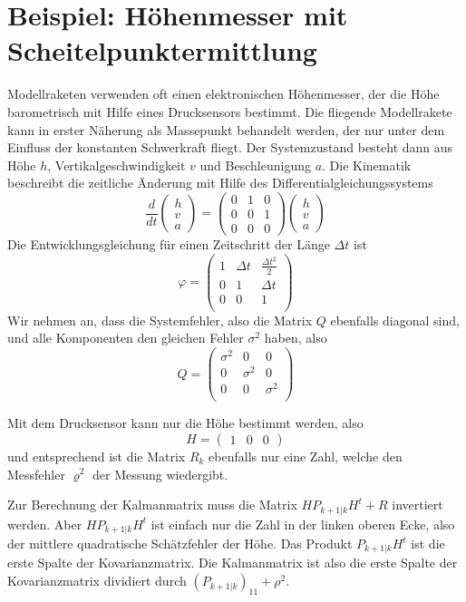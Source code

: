 %
%
%

\section{Beispiel: Höhenmesser mit Scheitelpunktermittlung}
Modellraketen verwenden oft einen elektronischen Höhenmesser, der die Höhe
barometrisch mit Hilfe eines Drucksensors bestimmt.
Die fliegende Modellrakete
kann in erster Näherung als Massepunkt behandelt werden, der nur unter dem
Einfluss der konstanten Schwerkraft fliegt.
Der Systemzustand besteht
dann aus Höhe $h$, Vertikalgeschwindigkeit $v$ und Beschleunigung $a$.
Die Kinematik beschreibt die zeitliche Änderung mit Hilfe des
Differentialgleichungssystems
\[
\frac{d}{dt}
\begin{pmatrix}
h\\v\\a
\end{pmatrix}
=
\begin{pmatrix}
0&1&0\\
0&0&1\\
0&0&0
\end{pmatrix}
\begin{pmatrix}
h\\v\\a
\end{pmatrix}
\]
Die Entwicklungsgleichung für einen Zeitschritt der Länge $\Delta t$ ist
\[
\varphi=\begin{pmatrix}
1&\Delta t&\frac{\Delta t^2}2\\
0&1&\Delta t\\
0&0&1\\
\end{pmatrix}
\]
Wir nehmen an, dass die Systemfehler, also die Matrix $Q$ ebenfalls diagonal sind,
und alle Komponenten den gleichen Fehler $\sigma^2$ haben, also
\[
Q=\begin{pmatrix}
\sigma^2&0&0\\
0&\sigma^2&0\\
0&0&\sigma^2\\
\end{pmatrix}
\]

Mit dem Drucksensor kann nur die Höhe bestimmt werden, also
\[
H=\begin{pmatrix}1&0&0\end{pmatrix}
\]
und entsprechend ist die Matrix $R_k$ ebenfalls nur eine Zahl, welche
den Messfehler $\varrho^2$ der Messung wiedergibt.

Zur Berechnung der Kalmanmatrix muss die Matrix $HP_{k+1|k}H^t+R$ invertiert werden.
Aber $HP_{k+1|k}H^t$ ist einfach nur die Zahl in der linken oberen Ecke, also
der mittlere quadratische Schätzfehler der Höhe.
Das Produkt $P_{k+1|k}H^t$
ist die erste Spalte der Kovarianzmatrix.
Die Kalmanmatrix ist also die erste
Spalte der Kovarianzmatrix dividiert durch $(P_{k+1|k})_{11}+\rho^2$.

